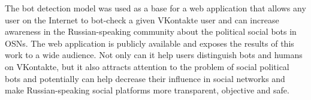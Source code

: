 The bot detection model was used as a base for a web application that allows any user on the Internet to bot-check a given VKontakte user and can increase awareness in the Russian-speaking community about the political social bots in OSNs. The web application is publicly available and exposes the results of this work to a wide audience. Not only can it help users distinguish bots and humans on VKontakte, but it also attracts attention to the problem of social political bots and potentially can help decrease their influence in social networks and make Russian-speaking social platforms more transparent, objective and safe. 

